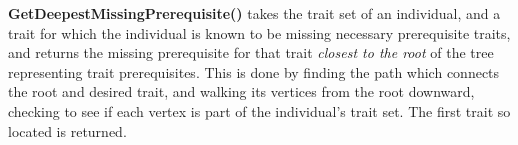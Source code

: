 \textbf{GetDeepestMissingPrerequisite()} takes the trait set of an individual, and a trait for which the individual is known to be missing necessary prerequisite traits, and returns the missing prerequisite for that trait \emph{closest to the root} of the tree representing trait prerequisites.  This is done by finding the path which connects the root and desired trait, and walking its vertices from the root downward, checking to see if each vertex is part of the individual's trait set.  The first trait so located is returned.  





